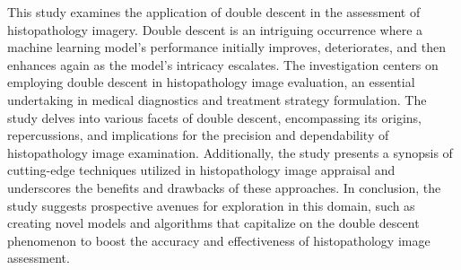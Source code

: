 This study examines the application of double descent in the assessment of histopathology imagery. Double descent is an intriguing occurrence where a machine learning model's performance initially improves, deteriorates, and then enhances again as the model's intricacy escalates. The investigation centers on employing double descent in histopathology image evaluation, an essential undertaking in medical diagnostics and treatment strategy formulation. The study delves into various facets of double descent, encompassing its origins, repercussions, and implications for the precision and dependability of histopathology image examination. Additionally, the study presents a synopsis of cutting-edge techniques utilized in histopathology image appraisal and underscores the benefits and drawbacks of these approaches. In conclusion, the study suggests prospective avenues for exploration in this domain, such as creating novel models and algorithms that capitalize on the double descent phenomenon to boost the accuracy and effectiveness of histopathology image assessment.